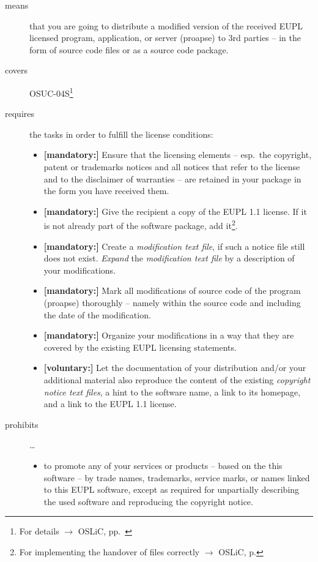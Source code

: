 \begin{description}
\item[means] that you are going to distribute a modified version of the received
EUPL licensed program, application, or server (proapse) to 3rd parties -- in the
form of source code files or as a source code package.
\item[covers] OSUC-04S\footnote{For details $\rightarrow$ OSLiC, pp.\
\pageref{OSUC-04S-DEF}}
\item[requires] the tasks in order to fulfill the license conditions:
\begin{itemize}
  
  \item \textbf{[mandatory:]} Ensure that the licensing elements -- esp.\ the
  copyright, patent or trademarks notices and all notices that refer to the
  license and to the disclaimer of warranties -- are retained in your package in
  the form you have received them.
  
  \item \textbf{[mandatory:]} Give the recipient a copy of the EUPL 1.1
  license. If it is not already part of the software package, add
  it\footnote{For implementing the handover of files correctly $\rightarrow$
  OSLiC, p. \pageref{DistributingFilesHint}}.

  \item \textbf{[mandatory:]} Create a \emph{modification text file}, if such a
  notice file still does not exist. \emph{Expand} the \emph{modification text
  file} by a description of your modifications.
    
  \item \textbf{[mandatory:]} Mark all modifications of source code of the
  program (proapse) thoroughly -- namely within the source code and including
  the date of the modification.
   
  \item \textbf{[mandatory:]} Organize your modifications in a way that they are
  covered by the existing EUPL licensing statements.
   
  \item \textbf{[voluntary:]} Let the documentation of your distribution and/or
  your additional material also reproduce the content of the existing
  \emph{copyright notice text files}, a hint to the software name, a link to its
  homepage, and a link to the EUPL 1.1 license.
  
 \end{itemize}
 
\item[prohibits] \ldots
\begin{itemize}
  \item to promote any of your services or products -- based on the this software
  -- by trade names, trademarks, service marks, or names linked to this EUPL
  software, except as required for unpartially describing the used software and
  reproducing the copyright notice.
\end{itemize}

\end{description}

